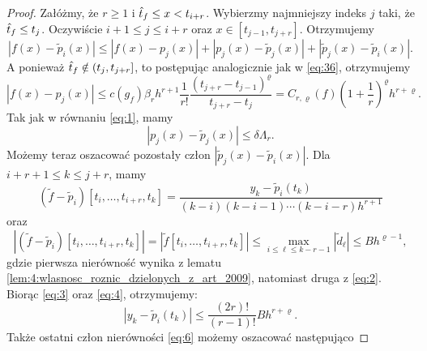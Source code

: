 \documentclass[oik, pdftex, man]{mgrwms}
\begin{document}
\begin{proof}
        Załóżmy, że $r \geq 1$ i $\hat{t}_{f} \leq x<t_{i+r}$. Wybierzmy najmniejszy indeks $j$ taki, że $\hat{t}_{f} \leq t_{j}$. Oczywiście $i+1 \leq j \leq i+r$ oraz $x \in\left[t_{j-1}, t_{j+r}\right]$. 
        Otrzymujemy
        \begin{equation} \label{eq:6}
            \left|f(x)-\tilde{p}_{i}(x)\right| \leq\left|f(x)-p_{j}(x)\right|+\left|p_{j}(x)-\tilde{p}_{j}(x)\right|+\left|\tilde{p}_{j}(x)-\tilde{p}_{i}(x)\right|.
        \end{equation}
        A ponieważ $\hat{t}_{f} \notin\left(t_{j}, t_{j+r}\right]$, to postępując analogicznie jak w \eqref{eq:36}, otrzymujemy
        \begin{equation*}
            \left|f(x)-p_{j}(x)\right| \leq c\left(g_{f}\right) \beta_{r} h^{r+1} \frac{1}{r !} \frac{\left(t_{j+r}-t_{j-1}\right)^{\varrho}}{t_{j+r}-t_{j}}=C_{r, \varrho}(f)\left(1+\frac{1}{r}\right)^{\varrho} h^{r+\varrho}.
        \end{equation*}
        Tak jak w równaniu \eqref{eq:1}, mamy
        \begin{equation*}
            \left|p_{j}(x)-\tilde{p}_{j}(x)\right| \leq \delta \Lambda_{r}.
        \end{equation*}
        Możemy teraz oszacować pozostały człon $\left|\tilde{p}_{j}(x)-\tilde{p}_{i}(x)\right|$. Dla $i+r+1 \leq k \leq j+r$, mamy
        \begin{equation} \label{eq:3}
            \left(\tilde{f}-\tilde{p}_{i}\right)\left[t_{i}, \ldots, t_{i+r}, t_{k}\right]=\frac{y_{k}-\tilde{p}_{i}\left(t_{k}\right)}{(k-i)(k-i-1) \cdots(k-i-r) h^{r+1}}
        \end{equation}
        oraz
        \begin{equation} \label{eq:4}
            \left|\left(\tilde{f}-\tilde{p}_{i}\right)\left[t_{i}, \ldots, t_{i+r}, t_{k}\right]\right|=\left|\tilde{f}\left[t_{i}, \ldots, t_{i+r}, t_{k}\right]\right| \leq \max_{i \leq \ell \leq k-r-1}\left|\tilde{d}_{\ell}\right| \leq B h^{\varrho-1},
        \end{equation}
        gdzie pierwsza nierówność wynika z lematu \ref{lem:4:wlasnosc_roznic_dzielonych_z_art_2009}, natomiast druga z \eqref{eq:2}. \\
        Biorąc \eqref{eq:3} oraz \eqref{eq:4}, otrzymujemy:
        \begin{equation} \label{eq:5}
            \left|y_{k}-\tilde{p}_{i}\left(t_{k}\right)\right| \leq \frac{(2 r) !}{(r-1) !} B h^{r+\varrho}.
        \end{equation}
        Także ostatni człon nierówności \eqref{eq:6} możemy oszacować następująco

\end{proof}
\end{document}
